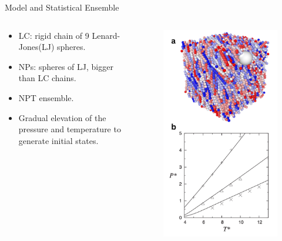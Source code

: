 \documentclass{beamer}
\begin{document}
\begin{frame}{Model and Statistical Ensemble}
   \begin{columns}
        \begin{column}{0.5\textwidth}
        \begin{itemize}
            \item LC: rigid chain of 9 Lenard-Jones(LJ) spheres.
            \item NPs: spheres of LJ, bigger than LC chains.
            \item NPT ensemble.
            \item Gradual elevation of the pressure and temperature to generate initial states.
        \end{itemize}
        \end{column}
        \begin{column}{0.5\textwidth}
            \begin{figure}
                \centering
                \includegraphics[scale = 0.20]{Figures/Model.png}

\end{figure}
\end{column}
\end{columns}
\end{frame}
\end{document}
